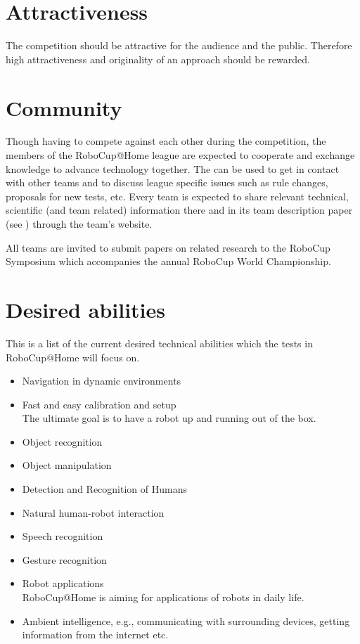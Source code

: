 \section{Attractiveness}
\label{concept:attractiveness}
The competition should be attractive for the audience and the public. Therefore high attractiveness and originality of an approach should be rewarded.

\section{Community}
\label{concept:community}
Though having to compete against each other during the competition, the members of the RoboCup@Home league are expected to cooperate and exchange knowledge to advance technology together. The  can be used to get in contact with other teams and to discuss league specific issues such as rule changes, proposals for new tests, etc.
Every team is expected to share relevant technical, scientific (and team related) information there and in its team description paper (see ) through the team's website.

All teams are invited to submit papers on related research to the RoboCup Symposium which accompanies the annual RoboCup World Championship.

\section{Desired abilities}
\label{concept:desired_abilities}
This is a list of the current desired technical abilities which the tests in RoboCup@Home will focus on.

\begin{itemize}
\item Navigation in dynamic environments
\item Fast and easy calibration and setup \\ The ultimate goal is to have a robot up and running out of the box.
\item Object recognition
\item Object manipulation
\item Detection and Recognition of Humans
\item Natural human-robot interaction
\item Speech recognition
\item Gesture recognition
\item Robot applications \\ RoboCup@Home is aiming for applications of robots in daily life.
\item Ambient intelligence, e.g., communicating with surrounding devices, getting information from the internet etc.
\end{itemize}